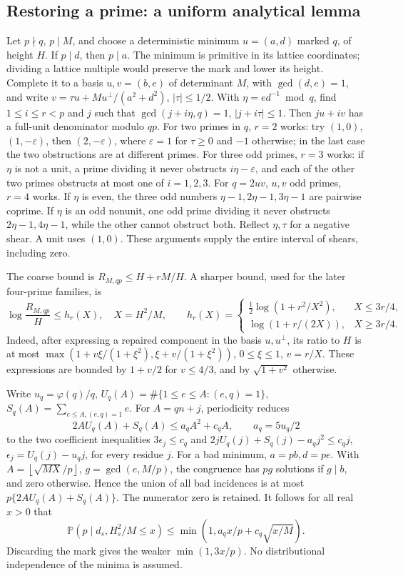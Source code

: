 \documentclass[11pt]{article}
\theoremstyle{definition}\newtheorem{definition}[theorem]{Definition}
\theoremstyle{remark}\newtheorem{remark}[theorem]{Remark}
\newcommand{\Prb}{\mathbb P}
\newcommand{\floor}[1]{\left\lfloor #1\right\rfloor}
\begin{document}
\subsection{Restoring a prime: a uniform analytical lemma}
Let \(p\nmid q\), \(p\mid M\), and choose a deterministic minimum
\(u=(a,d)\) marked \(q\), of height \(H\). If \(p\mid d\), then
\(p\mid a\). The minimum is primitive in its lattice coordinates;
dividing a lattice multiple would preserve the mark and lower its
height. Complete it to a basis \(u,v=(b,e)\) of determinant \(M\), with
\(\gcd(d,e)=1\), and write
\(v=\tau u+Mu^\perp/(a^2+d^2)\), \(|\tau|\le1/2\).
With \(\eta=ed^{-1}\bmod q\), find \(1\le i\le r<p\) and \(j\)
such that \(\gcd(j+i\eta,q)=1\), \(|j+i\tau|\le1\).
Then \(ju+iv\) has a full-unit denominator modulo \(qp\).
For two primes in \(q\), \(r=2\) works: try \((1,0)\),
\((1,-\varepsilon)\), then \((2,-\varepsilon)\),
where \(\varepsilon=1\) for \(\tau\ge0\) and \(-1\) otherwise;
in the last case the two
obstructions are at different primes. For three odd primes, \(r=3\)
works: if \(\eta\) is not a unit, a prime dividing it never obstructs
\(i\eta-\varepsilon\), and each of the other two primes obstructs at
most one of \(i=1,2,3\). For \(q=2uv\), \(u,v\) odd primes, \(r=4\)
works. If \(\eta\) is even, the three odd numbers
\(\eta-1,2\eta-1,3\eta-1\) are pairwise coprime. If \(\eta\) is an
odd nonunit, one odd prime dividing it never obstructs
\(2\eta-1,4\eta-1\), while the other cannot obstruct both.
Reflect \(\eta,\tau\) for a negative shear. A unit uses \((1,0)\).
These arguments supply the entire interval of shears, including zero.

The coarse bound is \(R_{M,qp}\le H+rM/H\).
A sharper bound, used for the later four-prime families, is
\[
 \log\frac{R_{M,qp}}{H}\le h_r(X),\quad X=H^2/M,\qquad
 h_r(X)=\begin{cases}
 \tfrac12\log(1+r^2/X^2),&X\le3r/4,\\
 \log(1+r/(2X)),&X\ge3r/4.
 \end{cases}                                                       \tag{E11}
\]
Indeed, after expressing a repaired component in the basis \(u,u^\perp\),
its ratio to \(H\) is at most
\(\max(1+v\xi/(1+\xi^2),\xi+v/(1+\xi^2))\),
\(0\le\xi\le1\), \(v=r/X\). These expressions are bounded by \(1+v/2\) for
\(v\le4/3\), and by \(\sqrt{1+v^2}\) otherwise.

Write \(u_q=\varphi(q)/q\),
\(U_q(A)=\#\{1\le e\le A:(e,q)=1\}\),
\(S_q(A)=\sum_{e\le A,(e,q)=1}e\).
For \(A=qn+j\), periodicity reduces
\[
 2AU_q(A)+S_q(A)\le a_qA^2+c_qA,\qquad a_q=5u_q/2                 \tag{E12}
\]
to the two coefficient inequalities
\(3\epsilon_j\le c_q\) and
\(2jU_q(j)+S_q(j)-a_qj^2\le c_qj\),
\(\epsilon_j=U_q(j)-u_qj\), for every residue \(j\).
For a bad minimum, \(a=pb,d=pe\). With
\(A=\floor{\sqrt{MX}/p}\), \(g=\gcd(e,M/p)\), the congruence has
\(pg\) solutions if \(g\mid b\), and zero otherwise. Hence the union
of all bad incidences is at most
\(p\{2AU_q(A)+S_q(A)\}\). The numerator zero is retained. It follows
for all real \(x>0\) that
\[
 \Prb(p\mid d_s,H_s^2/M\le x)
 \le\min(1,a_qx/p+c_q\sqrt{x/M}).                                  \tag{E13}
\]
Discarding the mark gives the weaker \(\min(1,3x/p)\).
No distributional independence of the minima is assumed.
\end{document}

